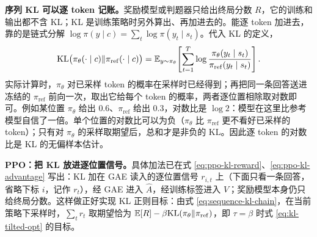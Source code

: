 \textbf{序列 KL 可以逐 token 记账。}奖励模型或判题器只给出终局分数 \(R\)，它的训练和输出都不含 KL；KL 是训练策略时另外算出、再加进去的。能逐 token 加进去，靠的是链式分解 \(\log\pi(y\mid c)=\sum_t\log\pi(y_t\mid s_t)\)。代入 KL 的定义，
\begin{equation}
 \mathrm{KL}\bigl(\pi_\theta(\cdot\mid c)\Vert\pi_{\mathrm{ref}}(\cdot\mid c)\bigr)
 =\mathbb{E}_{y\sim\pi_\theta}\!\left[\sum_{t=1}^{T}\log\frac{\pi_\theta(y_t\mid s_t)}{\pi_{\mathrm{ref}}(y_t\mid s_t)}\right].
 \label{eq:sequence-kl-chain}
\end{equation}
实际计算时，\(\pi_\theta\) 对已采样 token 的概率在采样时已经得到；再把同一条回答送进冻结的 \(\pi_{\mathrm{ref}}\) 前向一次，取出它给每个 token 的概率，两者逐位置相除取对数即可。例如某位置 \(\pi_\theta\) 给出 \(0.6\)、\(\pi_{\mathrm{ref}}\) 给出 \(0.3\)，对数比是 \(\log2\)：模型在这里比参考模型自信了一倍。单个位置的对数比可以为负（\(\pi_\theta\) 比 \(\pi_{\mathrm{ref}}\) 更不看好已采样的 token）；只有对 \(\pi_\theta\) 的采样取期望后，总和才是非负的 KL。因此逐 token 的对数比是 KL 的无偏样本估计。

\textbf{PPO：把 KL 放进逐位置信号。}具体加法已在式 \eqref{eq:ppo-kl-reward}、\eqref{eq:ppo-kl-advantage} 写出：KL 加在 GAE 读入的逐位置信号 \(r_{i,t}\) 上（下面只看一条回答，省略下标 \(i\)，记作 \(r_t\)），经 GAE 进入 \(\widehat A\)，经训练标签进入 \(V\)；奖励模型本身仍只给终局分数。这样做正好实现 KL 正则目标：由式 \eqref{eq:sequence-kl-chain}，在当前策略下采样时，\(\sum_tr_t\) 取期望恰为 \(\mathbb{E}[R]-\beta\mathrm{KL}(\pi_\theta\Vert\pi_{\mathrm{ref}})\)，即 \(\tau=\beta\) 时式 \eqref{eq:kl-tilted-opt} 的目标。

